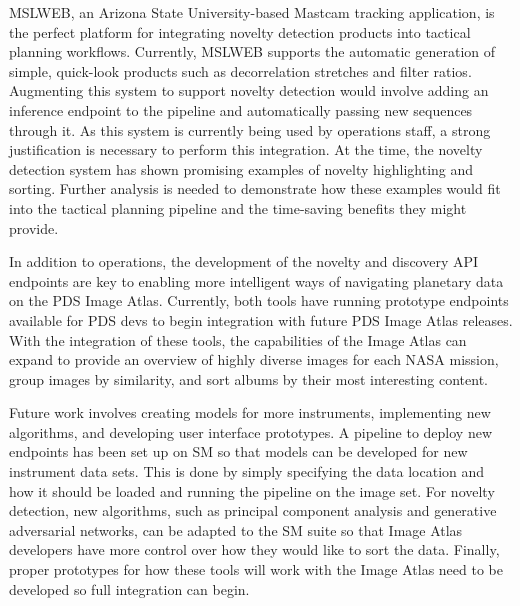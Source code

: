 MSLWEB, an Arizona State University-based Mastcam tracking application, is the perfect platform for integrating novelty detection products into tactical planning workflows. 
Currently, MSLWEB supports the automatic generation of simple, quick-look products such as decorrelation stretches and filter ratios. 
Augmenting this system to support novelty detection would involve adding an inference endpoint to the pipeline and automatically passing new sequences through it. 
As this system is currently being used by operations staff, a strong justification is necessary to perform this integration. 
At the time, the novelty detection system has shown promising examples of novelty highlighting and sorting. 
Further analysis is needed to demonstrate how these examples would fit into the tactical planning pipeline and the time-saving benefits they might provide.

In addition to operations, the development of the novelty and discovery API endpoints are key to enabling more intelligent ways of navigating planetary data on the PDS Image Atlas. 
Currently, both tools have running prototype endpoints available for PDS devs to begin integration with future PDS Image Atlas releases.
With the integration of these tools, the capabilities of the Image Atlas can expand to provide an overview of highly diverse images for each NASA mission, group images by similarity, and sort albums by their most interesting content.

Future work involves creating models for more instruments, implementing new algorithms, and developing user interface prototypes. 
A pipeline to deploy new endpoints has been set up on SM so that models can be developed for new instrument data sets. 
This is done by simply specifying the data location and how it should be loaded and running the pipeline on the image set. 
For novelty detection, new algorithms, such as principal component analysis and generative adversarial networks, can be adapted to the SM suite so that Image Atlas developers have more control over how they would like to sort the data. 
Finally, proper prototypes for how these tools will work with the Image Atlas need to be developed so full integration can begin.